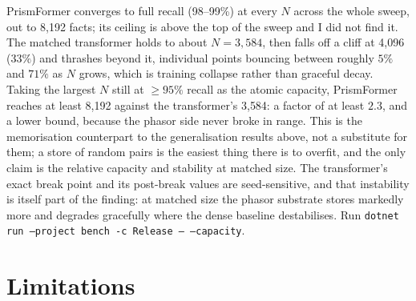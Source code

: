 \documentclass[11pt]{article}
\newcommand{\code}[1]{\texttt{#1}}
\begin{document}
PrismFormer converges to full recall (98--99\%) at every $N$ across the whole sweep, out to 8{,}192 facts;
its ceiling is above the top of the sweep and I did not find it. The matched transformer holds to about
$N=3{,}584$, then falls off a cliff at 4{,}096 ($33\%$) and thrashes beyond it, individual points bouncing
between roughly $5\%$ and $71\%$ as $N$ grows, which is training collapse rather than graceful decay.
Taking the largest $N$ still at $\geq\!95\%$ recall as the atomic capacity, PrismFormer reaches at least
8{,}192 against the transformer's 3{,}584: a factor of at least $2.3$, and a lower bound, because the
phasor side never broke in range. This is the memorisation counterpart to the generalisation results
above, not a substitute for them; a store of random pairs is the easiest thing there is to overfit, and
the only claim is the relative capacity and stability at matched size. The transformer's exact break point
and its post-break values are seed-sensitive, and that instability is itself part of the finding: at
matched size the phasor substrate stores markedly more and degrades gracefully where the dense baseline
destabilises. Run \code{dotnet run --project bench -c Release -- --capacity}.

\section{Limitations}\label{sec:lim}
\end{document}
